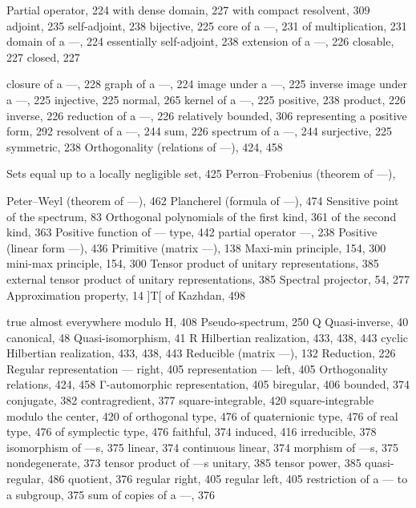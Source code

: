 Partial operator, 224 with dense domain, 227 with compact resolvent, 309 adjoint, 235 self-adjoint, 238 bijective, 225 core of a ---, 231 of multiplication, 231 domain of a ---, 224 essentially self-adjoint, 238 extension of a ---, 226 closable, 227 closed, 227

closure of a ---, 228 graph of a ---, 224 image under a ---, 225 inverse image under a ---, 225 injective, 225 normal, 265 kernel of a ---, 225 positive, 238 product, 226 inverse, 226 reduction of a ---, 226 relatively bounded, 306 representing a positive form,
292
resolvent of a ---, 244 sum, 226 spectrum of a ---, 244 surjective, 225 symmetric, 238 Orthogonality (relations of ---), 424,
458

Sets equal up to a locally negligible set, 425 Perron--Frobenius (theorem of ---),

Peter--Weyl (theorem of ---), 462 Plancherel (formula of ---), 474 Sensitive point of the spectrum, 83 Orthogonal polynomials of the first kind, 361 of the second kind, 363 Positive function of --- type, 442 partial operator ---, 238 Positive (linear form ---), 436 Primitive (matrix ---), 138 Maxi-min principle, 154, 300 mini-max principle, 154, 300 Tensor product of unitary representations, 385 external tensor product of unitary representations, 385 Spectral projector, 54, 277 Approximation property, 14 {]}T{[} of Kazhdan, 498

true almost everywhere modulo H, 408 Pseudo-spectrum, 250 Q Quasi-inverse, 40 canonical, 48 Quasi-isomorphism, 41 R Hilbertian realization, 433, 438, 443 cyclic Hilbertian realization, 433, 438, 443 Reducible (matrix ---), 132 Reduction, 226 Regular representation --- right, 405 representation --- left, 405 Orthogonality relations, 424, 458 Γ-automorphic representation, 405 biregular, 406 bounded, 374 conjugate, 382 contragredient, 377 square-integrable, 420 square-integrable modulo the center, 420 of orthogonal type, 476 of quaternionic type, 476 of real type, 476 of symplectic type, 476 faithful, 374 induced, 416 irreducible, 378 isomorphism of ---s, 375 linear, 374 continuous linear, 374 morphism of ---s, 375 nondegenerate, 373 tensor product of ---s unitary, 385 tensor power, 385 quasi-regular, 486 quotient, 376 regular right, 405 regular left, 405 restriction of a --- to a subgroup, 375 sum of copies of a ---, 376

